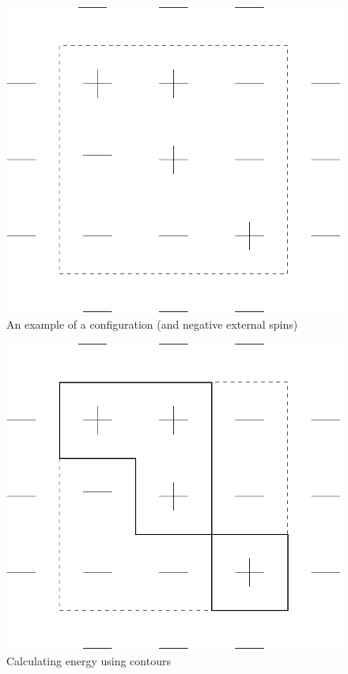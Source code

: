 \documentclass{article}
\begin{document}
\begin{figure}
\begin{center}
\includegraphics[scale=0.75]{config1}
\end{center}
\caption{An example of a configuration (and negative external spins)}
\label{figure1}
\end{figure}


\begin{figure}
\begin{center}
\includegraphics[scale=0.75]{config2}
\end{center}
\caption{Calculating energy using contours}
\label{figure2}
\end{figure}
\end{document}
